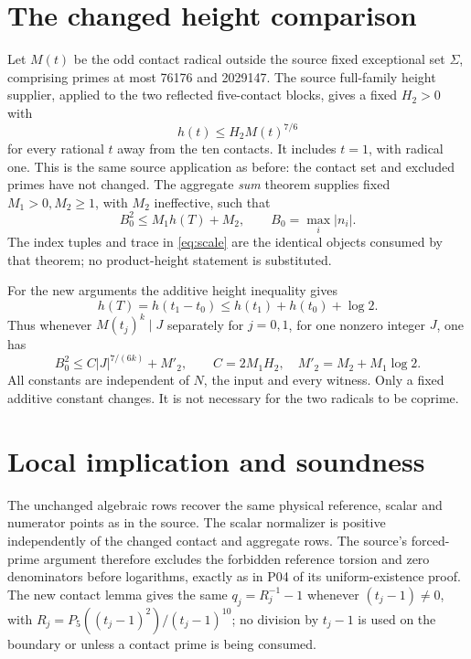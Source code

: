 \documentclass[11pt,a4paper]{article}
\begin{document}
\section{The changed height comparison}
Let $M(t)$ be the odd contact radical outside the source fixed
exceptional set $\Sigma$, comprising primes at most 76176 and
2029147. The source full-family height supplier, applied to the two
reflected five-contact blocks, gives a fixed $H_2>0$ with
\begin{equation}\label{eq:contactheight}
                         h(t)\le H_2M(t)^{7/6}
\end{equation}
for every rational $t$ away from the ten contacts. It includes
$t=1$, with radical one. This is the same source application as
before: the contact set and excluded primes have not changed.
The aggregate \emph{sum} theorem supplies fixed $M_1>0,M_2\ge1$,
with $M_2$ ineffective, such that
\[
       B_0^2\le M_1h(T)+M_2,\qquad B_0=\max_i|n_i|.
\]
The index tuples and trace in \eqref{eq:scale} are the identical
objects consumed by that theorem; no product-height statement is
substituted.

For the new arguments the additive height inequality gives
\begin{equation}\label{eq:addheight}
 h(T)=h(t_1-t_0)\le h(t_1)+h(t_0)+\log2.
\end{equation}
Thus whenever $M(t_j)^k\mid J$ separately for $j=0,1$, for one
nonzero integer $J$, one has
\begin{equation}\label{eq:bridge}
 B_0^2\le C|J|^{7/(6k)}+M'_2,\qquad
 C=2M_1H_2,\quad M'_2=M_2+M_1\log2.
\end{equation}
All constants are independent of $N$, the input and every witness.
Only a fixed additive constant changes. It is not necessary for the
two radicals to be coprime.

\section{Local implication and soundness}
The unchanged algebraic rows recover the same physical reference,
scalar and numerator points as in the source. The scalar normalizer
is positive independently of the changed contact and aggregate rows.
The source's forced-prime argument therefore excludes the forbidden
reference torsion and zero denominators before logarithms, exactly
as in P04 of its uniform-existence proof. The new contact lemma gives
the same $q_j=R_j^{-1}-1$ whenever $(t_j-1)\ne0$, with
$R_j=P_5((t_j-1)^2)/(t_j-1)^{10}$; no division by $t_j-1$ is used
on the boundary or unless a contact prime is being consumed.
\end{document}

